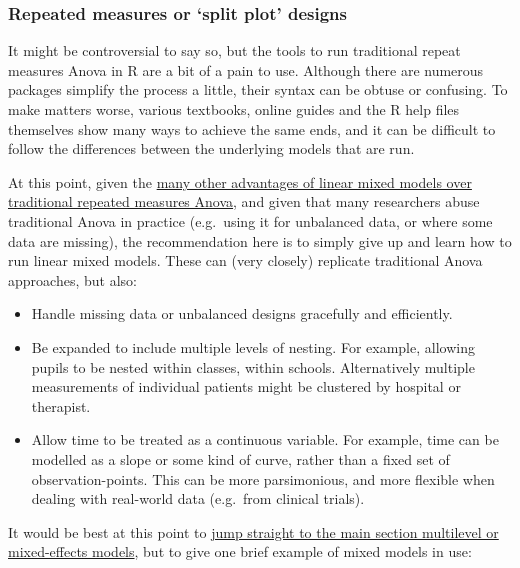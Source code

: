 \documentclass[]{article}
\theoremstyle{definition}
\theoremstyle{definition}
\theoremstyle{definition}
\theoremstyle{remark}
\begin{document}
\hypertarget{repeated-measures}{\subsubsection*{\texorpdfstring{Repeated
measures or `split plot'
designs}{Repeated measures or split plot designs}}\label{repeated-measures}}

It might be controversial to say so, but the tools to run traditional
repeat measures Anova in R are a bit of a pain to use. Although there
are numerous packages simplify the process a little, their syntax can be
obtuse or confusing. To make matters worse, various textbooks, online
guides and the R help files themselves show many ways to achieve the
same ends, and it can be difficult to follow the differences between the
underlying models that are run.

At this point, given the
\href{http://jamanetwork.com/journals/jamapsychiatry/article-abstract/481967}{many
other advantages of linear mixed models over traditional repeated
measures Anova}, and given that many researchers abuse traditional Anova
in practice (e.g.~using it for unbalanced data, or where some data are
missing), the recommendation here is to simply give up and learn how to
run linear mixed models. These can (very closely) replicate traditional
Anova approaches, but also:

\begin{itemize}
\item
  Handle missing data or unbalanced designs gracefully and efficiently.
\item
  Be expanded to include multiple levels of nesting. For example,
  allowing pupils to be nested within classes, within schools.
  Alternatively multiple measurements of individual patients might be
  clustered by hospital or therapist.
\item
  Allow time to be treated as a continuous variable. For example, time
  can be modelled as a slope or some kind of curve, rather than a fixed
  set of observation-points. This can be more parsimonious, and more
  flexible when dealing with real-world data (e.g.~from clinical
  trials).
\end{itemize}

It would be best at this point to
\protect\hyperlink{multilevel-models}{jump straight to the main section
multilevel or mixed-effects models}, but to give one brief example of
mixed models in use:
\end{document}

